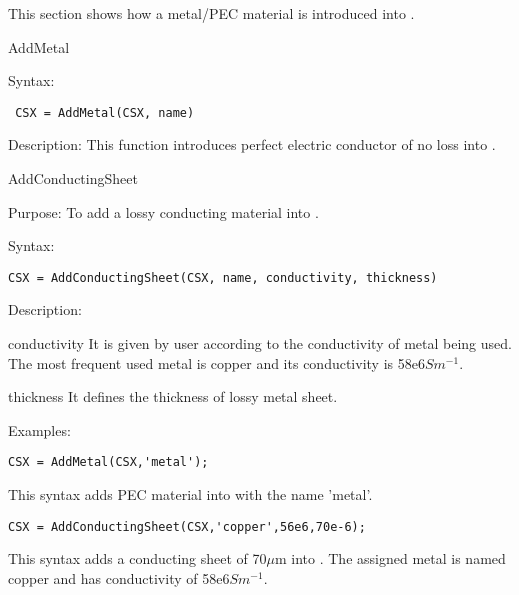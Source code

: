 This section shows how a metal/PEC material is introduced into
 \hyperref[CSX]{}.
 
\begin{FontNameFunct}{AddMetal}\label{addmetal}
\end{FontNameFunct}

\begin{FontDescr}{Syntax:}
  \begin{lstlisting}
 CSX = AddMetal(CSX, name)
  \end{lstlisting}
\end{FontDescr}  

\begin{FontDescr}{Description:}
This function introduces perfect electric conductor of no loss into \hyperref[CSX]{}.
\end{FontDescr}

 
\begin{FontNameFunct}{AddConductingSheet}
\end{FontNameFunct}

\begin{FontDescr}{Purpose:}
To add a lossy conducting material into \hyperref[CSX]{}.
\end{FontDescr}

\begin{FontDescr}{Syntax:}
  \begin{lstlisting}
CSX = AddConductingSheet(CSX, name, conductivity, thickness)
  \end{lstlisting}
\end{FontDescr} 

\begin{FontDescr}{Description:}

\begin{FontPara}{conductivity}
It is given by user according to the conductivity of metal being used. The most frequent used metal is copper and its conductivity is 58e6$Sm^{-1}$.    
\end{FontPara}

 \begin{FontPara}{thickness}
 It defines the thickness of lossy metal sheet.     
 \end{FontPara}
\end{FontDescr} 

\begin{FontDescr}{Examples:} 

\begin{lstlisting} 
CSX = AddMetal(CSX,'metal'); 
\end{lstlisting}
This syntax adds PEC material into \hyperref[CSX]{} with the name 'metal'. \\

\begin{lstlisting} 
CSX = AddConductingSheet(CSX,'copper',56e6,70e-6);
\end{lstlisting}
This syntax adds a conducting sheet of 70$\mu$m into \hyperref[CSX]{}. The assigned metal is named copper and has conductivity of 58e6$Sm^{-1}$.  

 \end{FontDescr} 
 
 
 
 